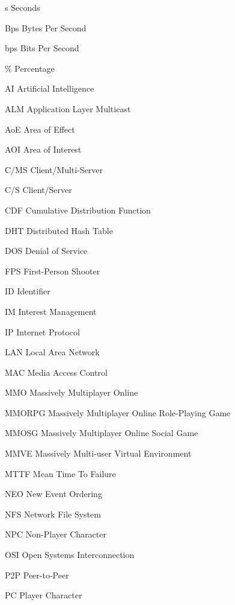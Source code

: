 \begin{Nomencl}[\gnat]
        \item[s]        Seconds
        \item[Bps]      Bytes Per Second
        \item[bps]      Bits Per Second
        \item[\%]       Percentage
        \item[AI]       Artificial Intelligence
        \item[ALM]      Application Layer Multicast
        \item[AoE]      Area of Effect
        \item[AOI]      Area of Interest
        \item[C/MS]     Client/Multi-Server
        \item[C/S]      Client/Server
        \item[CDF]      Cumulative Distribution Function
        \item[DHT]      Distributed Hash Table
        \item[DOS]      Denial of Service
        \item[FPS]      First-Person Shooter
        \item[ID]       Identifier
        \item[IM]       Interest Management
        \item[IP]       Internet Protocol
        \item[LAN]      Local Area Network
        \item[MAC]      Media Access Control
        \item[MMO]		Massively Multiplayer Online        
        \item[MMORPG]   Massively Multiplayer Online Role-Playing Game
        \item[MMOSG]    Massively Multiplayer Online Social Game
  		\item[MMVE]		Massively Multi-user Virtual Environment
        \item[MTTF]     Mean Time To Failure
        \item[NEO]      New Event Ordering
        \item[NFS]      Network File System
        \item[NPC]      Non-Player Character
        \item[OSI]      Open Systems Interconnection
        \item[P2P]      Peer-to-Peer
        \item[PC]       Player Character

\end{Nomencl}
